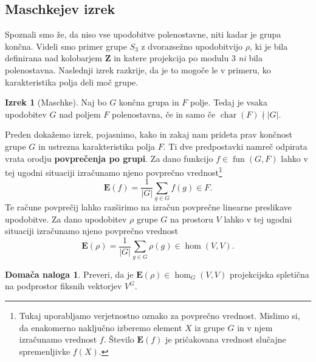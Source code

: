 \documentclass[11pt]{book}
\def\ZZ{\mathbf{Z}}
\def\EE{\mathbf{E}}
\DeclareMathOperator\characteristic{char}
\DeclareMathOperator\fun{fun}
\def\definicija{\color{rdeca}\bf}
\theoremstyle{definition}
\theoremstyle{zgled}
\theoremstyle{zgledbrezstevilke}
\theoremstyle{odprtproblem}
\theoremstyle{domacanaloga}
\newtheorem{domacanaloga}[theorem]{Domača naloga}
\theoremstyle{izrek}
\newtheorem{izrek}[theorem]{Izrek}
\begin{document}
\subsection{Maschkejev izrek}

Spoznali smo že, da niso vse upodobitve polenostavne, niti kadar je grupa končna. Videli smo primer grupe $S_3$ z dvorazsežno upodobitvijo $\rho$, ki je bila definirana nad kolobarjem $\ZZ$ in katere projekcija po modulu $3$ \emph{ni} bila polenostavna. Naslednji izrek razkrije, da je to mogoče le v primeru, ko karakteristika polja deli moč grupe.

\begin{izrek}[Maschke]
Naj bo $G$ končna grupa in $F$ polje. Tedaj je vsaka upodobitev $G$ nad poljem $F$ polenostavna, če in samo če $\characteristic(F) \nmid |G|$.
\end{izrek}

Preden dokažemo izrek, pojasnimo, kako in zakaj nam prideta prav končnost grupe $G$ in ustrezna karakteristika polja $F$. Ti dve predpostavki namreč odpirata vrata orodju {\definicija povprečenja po grupi}. Za dano funkcijo $f \in \fun(G,F)$ lahko v tej ugodni situaciji izračunamo njeno povprečno vrednost\footnote{Tukaj uporabljamo verjetnostno oznako za povprečno vrednost. Mislimo si, da enakomerno naključno izberemo element $X$ iz grupe $G$ in v njem izračunamo vrednost $f$. Število $\EE(f)$ je pričakovana vrednost slučajne spremenljivke $f(X)$.}
\[
    \EE(f) = \frac{1}{|G|} \sum_{g \in G} f(g) \in F.
\]
Te račune povprečij lahko razširimo na izračun povprečne linearne preslikave upodobitve. Za dano upodobitev $\rho$ grupe $G$ na prostoru $V$ lahko v tej ugodni situaciji izračunamo njeno povprečno vrednost
\[
    \EE(\rho) = \frac{1}{|G|} \sum_{g \in G} \rho(g) \in \hom(V,V).
\]

\begin{domacanaloga}
Preveri, da je $\EE(\rho) \in \hom_G(V,V)$ projekcijska spletična na podprostor fiksnih vektorjev $V^G$. 
\end{domacanaloga}
\end{document}
